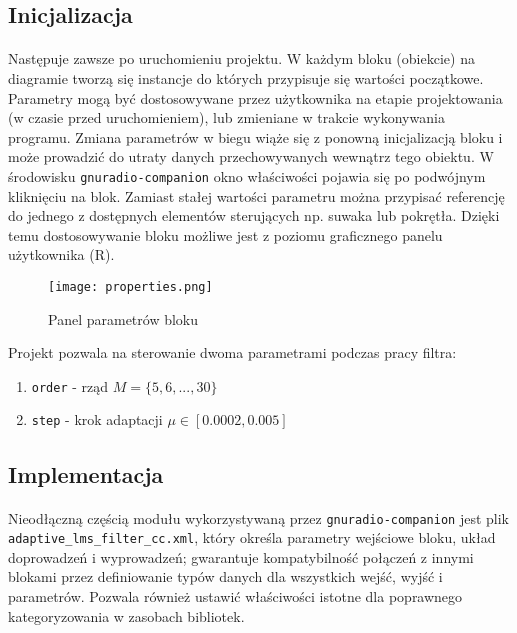 \subsection{Inicjalizacja}
\paragraph{}
Następuje zawsze po uruchomieniu projektu. 
W każdym bloku (obiekcie) na diagramie tworzą się instancje do których przypisuje się wartości początkowe.
Parametry mogą być dostosowywane przez użytkownika na etapie projektowania (w czasie przed uruchomieniem), lub zmieniane w trakcie wykonywania programu.
Zmiana parametrów w biegu wiąże się z ponowną inicjalizacją bloku i może prowadzić do utraty danych przechowywanych wewnątrz tego obiektu. 
W środowisku \texttt{gnuradio-companion} okno właściwości pojawia się po podwójnym kliknięciu na blok. 
Zamiast stałej wartości parametru można przypisać referencję do jednego z dostępnych elementów sterujących np. suwaka lub pokrętła. 
Dzięki temu dostosowywanie bloku możliwe jest z poziomu graficznego panelu użytkownika (R).

\begin{figure}[t]
\centering
\texttt{[image: properties.png]}
\caption{Panel parametrów bloku}
\label{blockproperties}
\end{figure}

Projekt pozwala na sterowanie dwoma parametrami podczas pracy filtra:
\begin{enumerate}
\item \texttt{order} - rząd $M = \{5,6,...,30\}$
\item \texttt{step} - krok adaptacji $\mu \in [0.0002, 0.005]$
\end{enumerate}

\subsection{Implementacja}
\paragraph{}
Nieodłączną częścią modułu wykorzystywaną przez \texttt{gnuradio-companion} jest plik \texttt{adaptive\_lms\_filter\_cc.xml}, który określa parametry wejściowe bloku, układ doprowadzeń i wyprowadzeń; gwarantuje kompatybilność połączeń z innymi blokami przez definiowanie typów danych dla wszystkich wejść, wyjść i parametrów. 
Pozwala również ustawić właściwości istotne dla poprawnego kategoryzowania w zasobach bibliotek.

